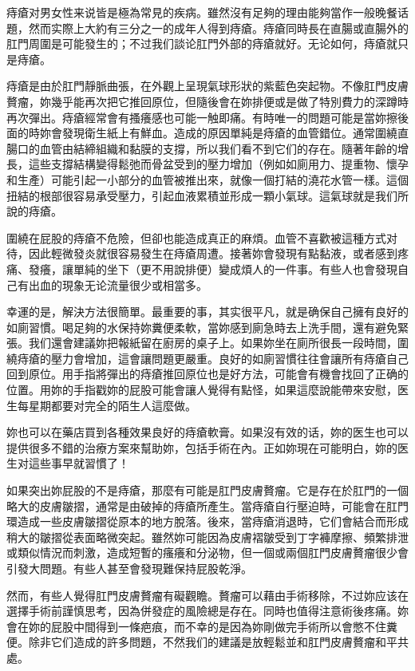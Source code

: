 \documentclass[12pt,UTF8]{ctexbook}
\begin{document}
痔瘡对男女性来说皆是極為常見的疾病。雖然沒有足夠的理由能夠當作一般晚餐话題，然而实際上大約有三分之一的成年人得到痔瘡。痔瘡同時長在直腸或直腸外的肛門周圍是可能發生的；不过我们談论肛門外部的痔瘡就好。无论如何，痔瘡就只是痔瘡。

痔瘡是由於肛門靜脈曲張，在外觀上呈現氣球形狀的紫藍色突起物。不像肛門皮膚贅瘤，妳幾乎能再次把它推回原位，但隨後會在妳排便或是做了特別費力的深蹲時再次彈出。痔瘡經常會有搔癢感也可能一触即痛。有時唯一的問題可能是當妳擦後面的時妳會發現衛生紙上有鮮血。造成的原因單純是痔瘡的血管錯位。通常圍繞直腸口的血管由結締組織和黏膜的支撐，所以我们看不到它们的存在。隨著年齡的增長，這些支撐結構變得鬆弛而骨盆受到的壓力增加（例如如廁用力、提重物、懷孕和生產）可能引起一小部分的血管被推出來，就像一個打結的澆花水管一樣。這個扭結的根部很容易承受壓力，引起血液累積並形成一顆小氣球。這氣球就是我们所說的痔瘡。

圍繞在屁股的痔瘡不危險，但卻也能造成真正的麻煩。血管不喜歡被這種方式对待，因此輕微發炎就很容易發生在痔瘡周遭。接著妳會發現有點黏液，或者感到疼痛、發癢，讓單純的坐下（更不用說排便）變成煩人的一件事。有些人也會發現自己有出血的現象无论流量很少或相當多。

幸運的是，解決方法很簡單。最重要的事，其实很平凡，就是确保自己擁有良好的如廁習慣。喝足夠的水保持妳糞便柔軟，當妳感到廁急時去上洗手間，還有避免緊張。我们還會建議妳把報紙留在廚房的桌子上。如果妳坐在廁所很長一段時間，圍繞痔瘡的壓力會增加，這會讓問題更嚴重。良好的如廁習慣往往會讓所有痔瘡自己回到原位。用手指將彈出的痔瘡推回原位也是好方法，可能會有機會找回了正确的位置。用妳的手指戳妳的屁股可能會讓人覺得有點怪，如果這麼說能帶來安慰，医生每星期都要对完全的陌生人這麼做。

妳也可以在藥店買到各種效果良好的痔瘡軟膏。如果沒有效的话，妳的医生也可以提供很多不錯的治療方案來幫助妳，包括手術在內。正如妳現在可能明白，妳的医生对這些事早就習慣了！

如果突出妳屁股的不是痔瘡，那麼有可能是肛門皮膚贅瘤。它是存在於肛門的一個略大的皮膚皺摺，通常是由破掉的痔瘡所產生。當痔瘡自行壓迫時，可能會在肛門環造成一些皮膚皺摺從原本的地方脫落。後來，當痔瘡消退時，它们會結合而形成稍大的皺摺從表面略微突起。雖然妳可能因為皮膚褶皺受到丁字褲摩擦、頻繁排泄或類似情況而刺激，造成短暫的瘙癢和分泌物，但一個或兩個肛門皮膚贅瘤很少會引發大問題。有些人甚至會發現難保持屁股乾淨。

然而，有些人覺得肛門皮膚贅瘤有礙觀瞻。贅瘤可以藉由手術移除，不过妳应该在選擇手術前謹慎思考，因為併發症的風險總是存在。同時也值得注意術後疼痛。妳會在妳的屁股中間得到一條疤痕，而不幸的是因為妳剛做完手術所以會憋不住糞便。除非它们造成的許多問題，不然我们的建議是放輕鬆並和肛門皮膚贅瘤和平共處。
\end{document}
